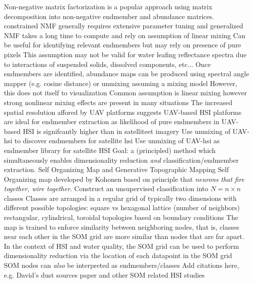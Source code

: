 \documentclass{article}
\begin{document}
\begin{outline}[enumerate]
            \4 Non-negative matrix factorization is a popular approach using matrix decomposition into non-negative endmember and abundance matrices. constrained NMF generally requires extensive parameter tuning and generalized NMF takes a long time to compute and rely on assumption of linear mixing \cite{Feng2022HyperspectralUB}
        \3 Can be useful for identifying relevant endmembers but may rely on presence of pure pixels
            \4 This assumption may not be valid for water leafing reflectance spectra due to interactions of suspended solids, dissolved components, etc...
        \3 Once endmembers are identified, abundance maps can be produced using spectral angle mapper (e.g. cosine distance) or unmixing assuming a mixing model
            \4 However, this does not itself to visualization
            \4 Common assumption is linear mixing however strong nonlinear mixing effects are present in many situations \cite{heylen2014review}
        \3 The increased spatial resolution affored by UAV platforms suggests UAV-based HSI platforms are ideal for endmember extraction as likelihood of pure endmembers in UAV-based HSI is signifcantly higher than in satelliteet imagery
            \4 Use unmixing of UAV-hsi to discover endmembers for satellite hsi \cite{alvarez2020can}
            \4 Use unmixing of UAV-hsi as endmember library for satellite HSI \cite{gu2023intrinsic}
    \2 Goal: a (principled) method which simultaneously enables dimensionality reduction \textit{and} classification/endmember extraction.
\1 Self Organizing Map and Generative Topographic Mapping
    \2 Self Organizing map developed by Kohonen based on principle that \textit{neurons that fire together, wire together}. \cite{kohonen-som-1}
        \3 Construct an unsupervised classification into $N=n\times n$ classes
        \3 Classes are arranged in a regular grid of typically two dimensions with different possible topologies:
            \4 square vs hexagonal lattice (number of neighbors)
            \4 rectangular, cylindrical, toroidal topologies based on boundary conditions
        \3 The map is trained to enforce similarity between neighboring nodes, that is, classes near each other in the SOM grid are more similar than nodes that are far apart. 
        \3 In the context of HSI and water quality, the SOM grid can be used to perform dimensionality reduction via the location of each datapoint in the SOM grid 
        \3 SOM nodes can \textit{also} be interpreted as endmembers/classes
            \4 Add citations here, e.g. David's dust sources paper and other SOM related HSI studies

\end{outline}
\end{document}
